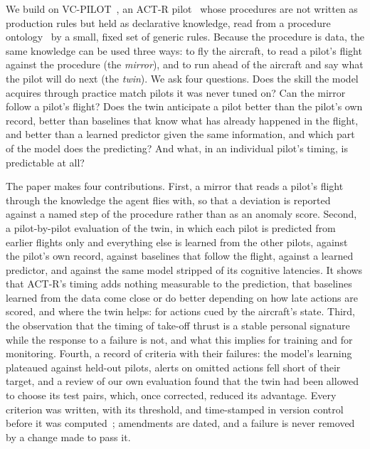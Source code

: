 \documentclass{llncs}
\begin{document}
We build on VC-PILOT~\cite{kengne_cpilot_2026}, an ACT-R pilot~\cite{anderson2004integrated} whose procedures are not written as
production rules but held as declarative knowledge, read from a procedure ontology~\cite{courtemanche_ontological_2022} by a small,
fixed set of generic rules. Because the procedure is data, the same knowledge can be used three ways: to fly the aircraft, to read a
pilot's flight against the procedure (the \emph{mirror}), and to run ahead of the aircraft and say what the pilot will do next (the
\emph{twin}). We ask four questions. Does the skill the model acquires through practice match pilots it was never tuned on? Can the
mirror follow a pilot's flight? Does the twin anticipate a pilot better than the pilot's own record, better than baselines that know
what has already happened in the flight, and better than a learned predictor given the same information, and which part of the model
does the predicting? And what, in an individual pilot's timing, is predictable at all?

The paper makes four contributions. First, a mirror that reads a pilot's flight through the knowledge the agent flies with, so that a
deviation is reported against a named step of the procedure rather than as an anomaly score. Second, a pilot-by-pilot evaluation of the
twin, in which each pilot is predicted from earlier flights only and everything else is learned from the other pilots, against the
pilot's own record, against baselines that follow the flight, against a learned predictor, and against the same model stripped of its
cognitive latencies. It shows that ACT-R's timing adds nothing measurable to the prediction, that baselines learned from the data come
close or do better depending on how late actions are scored, and where the twin helps: for actions cued by the aircraft's state.
Third, the observation that the timing of take-off thrust is a stable personal signature while the response to a failure is not, and
what this implies for training and for monitoring. Fourth, a record of criteria with their failures: the model's learning plateaued
against held-out pilots, alerts on omitted actions fell short of their target, and a review of our own evaluation found that the twin
had been allowed to choose its test pairs, which, once corrected, reduced its advantage. Every criterion was written, with its threshold,
and time-stamped in version control before it was computed~\cite{nosek_preregistration_2018}; amendments are dated, and a failure is
never removed by a change made to pass it.
\end{document}
